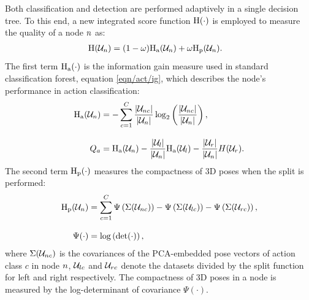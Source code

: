 Both classification and detection are performed adaptively in a single decision tree. To this end, a new integrated score function $\mathrm{H}(\cdot)$ is employed to measure the quality of a node $n$ as:
\begin{align}
	\label{eqn/body/newquality}
	\mathrm{H}(\mathcal{U}_{n}) & = (1 - \omega)\mathrm{H_{a}}(\mathcal{U}_{n}) + \omega\mathrm{H_{p}}(\mathcal{U}_{n}).
\end{align}
The first term $\mathrm{H_{a}}(\cdot)$ is the information gain measure used in standard classification forest, \cf equation \ref{eqn/act/ig}, which describes the node's performance in action classification: 
\begin{equation}
	\label{eqn/body/infogain}
	\begin{aligned}
		\mathrm{H_{a}}(\mathcal{U}_{n}) & = 
		- \displaystyle\sum_{c = 1}^{C} \frac{|\mathcal{U}_{n c}|}{|\mathcal{U}_{n}|}\log_{2}\left(\frac{|\mathcal{U}_{n c}|}{|\mathcal{U}_{n}|}\right), \\[3mm]
		Q_{a} & = 
		\mathrm{H_{a}}(\mathcal{U}_{n}) - 
		\frac{|\mathcal{U}_{l}|}{|\mathcal{U}_{n}|} \mathrm{H_{a}}(\mathcal{U}_{l}) -  
		\frac{|\mathcal{U}_{r}|}{|\mathcal{U}_{n}|} H(\mathcal{U}_{r}). 
	\end{aligned}
\end{equation}
The second term $\mathrm{H_{p}}(\cdot)$ measures the compactness of 3D poses when the split is performed:
\begin{align}
	\mathrm{H_{p}}(\mathcal{U}_{n}) & = \displaystyle\sum_{c = 1}^{C} \Psi\left(\Sigma(\mathcal{U}_{n c})\right) - \Psi\left(\Sigma(\mathcal{U}_{lc})\right) 
	- \Psi\left(\Sigma(\mathcal{U}_{rc})\right), \\[3mm]
	\Psi(\cdot) & = \log\left(\det(\cdot)\right),
\end{align} 
where $\Sigma(\mathcal{U}_{n c})$ is the covariances of the PCA-embedded pose vectors of action class $c$ in node $n$, $\mathcal{U}_{lc}$ and $\mathcal{U}_{rc}$ denote the datasets divided by the split function for left and right respectively. The compactness of 3D poses in a node is measured by the log-determinant of covariance $\Psi(\cdot)$. 

